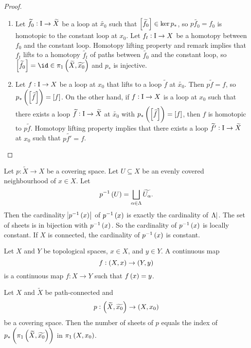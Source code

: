 \begin{proof}
\hfill
\begin{enumerate}
\item Let $ \widetilde{f_0} : \mathrm{I} \to \widetilde{X} $ be a loop at $ \widetilde{x_0} $ such that $ \sbr{\widetilde{f_0}} \in \ker p_* $, so $ p\widetilde{f_0} = f_0 $ is homotopic to the constant loop at $ x_0 $. Let $ f_t : \mathrm{I} \to X $ be a homotopy between $ f_0 $ and the constant loop. Homotopy lifting property and remark implies that $ f_t $ lifts to a homotopy $ \widetilde{f_t} $ of paths between $ \widetilde{f_0} $ and the constant loop, so $ \sbr{\widetilde{f_0}} = \id \in \pi_1\br{\widetilde{X}, \widetilde{x_0}} $ and $ p_* $ is injective.
\item Let $ f : \mathrm{I} \to X $ be a loop at $ x_0 $ that lifts to a loop $ \widetilde{f} $ at $ \widetilde{x_0} $. Then $ p\widetilde{f} = f $, so $ p_*\br{\sbr{\widetilde{f}}} = \sbr{f} $. On the other hand, if $ f : \mathrm{I} \to X $ is a loop at $ x_0 $ such that there exists a loop $ \widetilde{f} : \mathrm{I} \to \widetilde{X} $ at $ \widetilde{x_0} $ with $ p_*\br{\sbr{\widetilde{f}}} = \sbr{f} $, then $ f $ is homotopic to $ p\widetilde{f} $. Homotopy lifting property implies that there exists a loop $ \widetilde{f'} : \mathrm{I} \to \widetilde{X} $ at $ x_0 $ such that $ p\widetilde{f'} = f $.
\end{enumerate}
\end{proof}


Let $ p : \widetilde{X} \to X $ be a covering space. Let $ U \subseteq X $ be an evenly covered neighbourhood of $ x \in X $. Let
$$ p^{-1}\br{U} = \bigsqcup_{\alpha \in \Lambda} \widetilde{U_\alpha}. $$
Then the cardinality $ \abs{p^{-1}\br{x}} $ of $ p^{-1}\br{x} $ is exactly the cardinality of $ \abs{\Lambda} $. The set of sheets is in bijection with $ p^{-1}\br{x} $. So the cardinality of $ p^{-1}\br{x} $ is locally constant. If $ X $ is connected, the cardinality of $ p^{-1}\br{x} $ is constant.

\begin{notation*}
Let $ X $ and $ Y $ be topological spaces, $ x \in X $, and $ y \in Y $. A continuous map
$$ f : \br{X, x} \to \br{Y, y} $$
is a continuous map $ f : X \to Y $ such that $ f\br{x} = y $.
\end{notation*}

\begin{proposition}
Let $ X $ and $ \widetilde{X} $ be path-connected and
$$ p : \br{\widetilde{X}, \widetilde{x_0}} \to \br{X, x_0} $$
be a covering space. Then the number of sheets of $ p $ equals the index of $ p_*\br{\pi_1\br{\widetilde{X}, \widetilde{x_0}}} $ in $ \pi_1\br{X, x_0} $.
\end{proposition}

